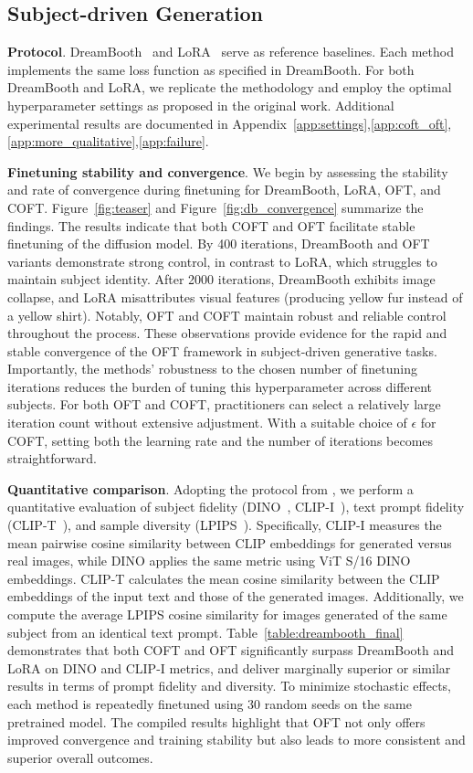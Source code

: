 {\subsection{Subject-driven Generation}

\textbf{Protocol}. DreamBooth~\cite{ruiz2023dreambooth} and LoRA~\cite{hulora2022} serve as reference baselines. Each method implements the same loss function as specified in DreamBooth. For both DreamBooth and LoRA, we replicate the methodology and employ the optimal hyperparameter settings as proposed in the original work. Additional experimental results are documented in Appendix~\ref{app:settings},\ref{app:coft_oft},\ref{app:more_qualitative},\ref{app:failure}.

\textbf{Finetuning stability and convergence}. We begin by assessing the stability and rate of convergence during finetuning for DreamBooth, LoRA, OFT, and COFT. Figure~\ref{fig:teaser} and Figure~\ref{fig:db_convergence} summarize the findings. The results indicate that both COFT and OFT facilitate stable finetuning of the diffusion model. By 400 iterations, DreamBooth and OFT variants demonstrate strong control, in contrast to LoRA, which struggles to maintain subject identity. After 2000 iterations, DreamBooth exhibits image collapse, and LoRA misattributes visual features (producing yellow fur instead of a yellow shirt). Notably, OFT and COFT maintain robust and reliable control throughout the process. These observations provide evidence for the rapid and stable convergence of the OFT framework in subject-driven generative tasks. Importantly, the methods’ robustness to the chosen number of finetuning iterations reduces the burden of tuning this hyperparameter across different subjects. For both OFT and COFT, practitioners can select a relatively large iteration count without extensive adjustment. With a suitable choice of $\epsilon$ for COFT, setting both the learning rate and the number of iterations becomes straightforward.

\textbf{Quantitative comparison}. Adopting the protocol from \cite{ruiz2023dreambooth}, we perform a quantitative evaluation of subject fidelity (DINO~\cite{caron2021emerging}, CLIP-I~\cite{radford2021learning}), text prompt fidelity (CLIP-T~\cite{radford2021learning}), and sample diversity (LPIPS~\cite{zhang2018unreasonable}). Specifically, CLIP-I measures the mean pairwise cosine similarity between CLIP embeddings for generated versus real images, while DINO applies the same metric using ViT S/16 DINO embeddings. CLIP-T calculates the mean cosine similarity between the CLIP embeddings of the input text and those of the generated images. Additionally, we compute the average LPIPS cosine similarity for images generated of the same subject from an identical text prompt. Table~\ref{table:dreambooth_final} demonstrates that both COFT and OFT significantly surpass DreamBooth and LoRA on DINO and CLIP-I metrics, and deliver marginally superior or similar results in terms of prompt fidelity and diversity. To minimize stochastic effects, each method is repeatedly finetuned using 30 random seeds on the same pretrained model. The compiled results highlight that OFT not only offers improved convergence and training stability but also leads to more consistent and superior overall outcomes.

}
